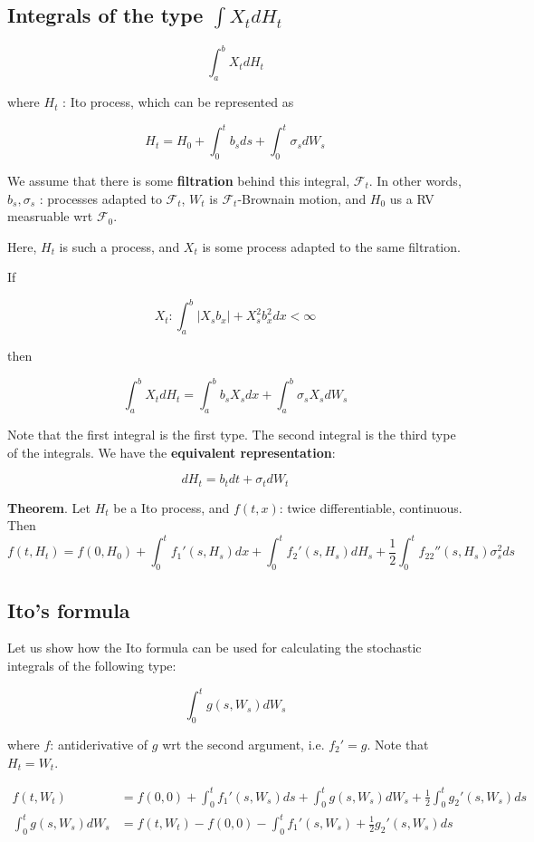 \documentclass[12pt]{article}
\theoremstyle{nonumberbreak}
\begin{document}
\subsection{Integrals of the type $\int X_t d H_t$}

$$
\int_a^b X_t dH_t
$$

where $H_t$ : Ito process, which can be represented as

$$
H_t = H_0 + \int_0^t b_s ds + \int_0^t \sigma_s dW_s
$$

We assume that there is some \textbf{filtration} behind this integral, $\mathcal{F}_t$. In other words, $b_s, \sigma_s$ : processes adapted to $\mathcal{F}_t$, $W_t$ is $\mathcal{F}_t$-Brownain motion, and $H_0$ us a RV measruable wrt $\mathcal{F}_0$.

Here, $H_t$ is such a process, and $X_t$ is some process adapted to the same filtration.  

If

$$
X_t: \int_a^b |X_s b_x| + X_s^2 b_x^2 dx < \infty
$$

then 

$$
\int_a^b X_t dH_t = \int_a^b b_s X_s dx + \int_a^b \sigma_s X_s dW_s
$$

Note that the first integral is the first type. The second integral is the third type of the integrals. We have the \textbf{equivalent representation}:

$$
dH_t = b_t dt + \sigma_t d W_t
$$

\begin{theorem}
\textbf{Theorem}. Let $H_t$ be a Ito process, and $f(t,x)$: twice differentiable, continuous. Then
$$
f(t,H_t) = f(0,H_0) + \int_0^t f_1' (s, H_s) dx + \int_0^t f_2'(s, H_s) dH_s + \frac{1}{2} \int_0^t f_{22}'' (s,H_s)\sigma_s^2 ds
$$

\end{theorem}


\subsection{Ito's formula}

Let us show how the Ito formula can be used for calculating the stochastic integrals of the following type:

$$
\int_0^t g(s, W_s) dW_s
$$

where $f$: antiderivative of $g$ wrt the second argument, i.e. $f_2' = g$. Note that $H_t = W_t$. 

$$
\begin{aligned}
f(t, W_t) &= f(0,0) + \int_0^t f_1' (s,W_s) ds + \int_0^t g(s,W_s) dW_s + \frac{1}{2} \int_0^t g_2' (s,W_s) ds \\[10pt]
\int_0^t g(s,W_s) dW_s &= f(t,W_t) - f(0,0) - \int_0^t f_1' (s,W_s) + \frac{1}{2}g_2'(s,W_s) ds
\end{aligned}
$$
\end{document}
